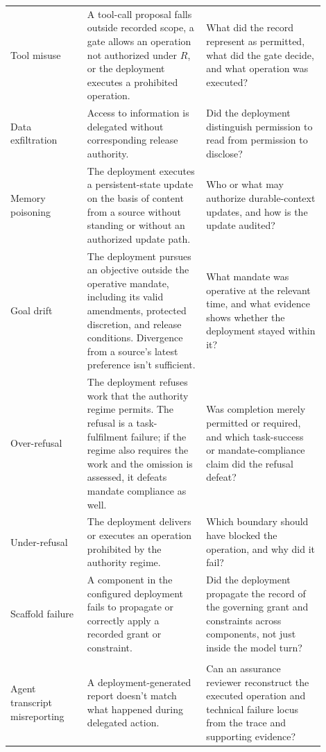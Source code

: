 \begin{table}[p]
\begin{tabular}{>{\raggedright\arraybackslash}p{0.22\linewidth}%
                >{\raggedright\arraybackslash}p{0.34\linewidth}%
                >{\raggedright\arraybackslash}p{0.34\linewidth}}
\midrule
\multicolumn{3}{l}{\textit{Proposal, gate, and execution failures}} \\
\midrule
Tool misuse & A tool-call proposal falls outside recorded scope, a gate allows an operation not authorized under \(R\), or the deployment executes a prohibited operation. & What did the record represent as permitted, what did the gate decide, and what operation was executed? \\
Data exfiltration & Access to information is delegated without corresponding release authority. & Did the deployment distinguish permission to read from permission to disclose? \\
Memory poisoning & The deployment executes a persistent-state update on the basis of content from a source without standing or without an authorized update path. & Who or what may authorize durable-context updates, and how is the update audited? \\
Goal drift & The deployment pursues an objective outside the operative mandate, including its valid amendments, protected discretion, and release conditions. Divergence from a source's latest preference isn't sufficient. & What mandate was operative at the relevant time, and what evidence shows whether the deployment stayed within it? \\
Over-refusal & The deployment refuses work that the authority regime permits. The refusal is a task-fulfilment failure; if the regime also requires the work and the omission is assessed, it defeats mandate compliance as well. & Was completion merely permitted or required, and which task-success or mandate-compliance claim did the refusal defeat? \\
Under-refusal & The deployment delivers or executes an operation prohibited by the authority regime. & Which boundary should have blocked the operation, and why did it fail? \\
Scaffold failure & A component in the configured deployment fails to propagate or correctly apply a recorded grant or constraint. & Did the deployment propagate the record of the governing grant and constraints across components, not just inside the model turn? \\
\midrule
\multicolumn{3}{l}{\textit{Evidentiary and evaluation failures}} \\
\midrule
Agent transcript misreporting & A deployment-generated report doesn't match what happened during delegated action. & Can an assurance reviewer reconstruct the executed operation and technical failure locus from the trace and supporting evidence? \\

\end{tabular}
\end{table}
